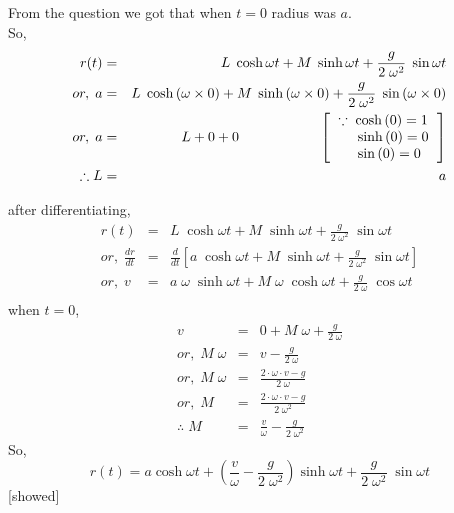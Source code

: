 \documentclass{article}
\begin{document}
\subsection{}%
\large{
    From the question we got that when $t=0$ radius was $a$.\\
    So,
    \begin{eqnarray*}
        r(t) &=& L\;\cosh{\omega t} + M\;\sinh{\omega t} + \frac{g}{2\;\omega^2}\;\sin{\omega t}\\
        or,\; a &=& L\;\cosh{(\omega\times 0)} + M\;\sinh{(\omega\times 0)} + \frac{g}{2\;\omega^2}\;\sin{(\omega \times 0)}\\
        or,\; a &=& L + 0 + 0\hspace{2cm}
        \left[
            \begin{tabular}{ll}
                $\because\; \cosh{(0)} = 1$\\
                $\;\;\;\;\; \sinh{(0)} = 0$\\
                $\;\;\;\;\; \sin{(0)} = 0$\\
            \end{tabular}
        \right]\\
        \therefore L &=& a
    \end{eqnarray*}

    after differentiating,
    \begin{eqnarray*}
        r(t) &=& L\;\cosh{\omega t} + M\;\sinh{\omega t} + \frac{g}{2\;\omega^2}\;\sin{\omega t}\\
        or,\;\frac{dr}{dt} &=& \frac{d}{dt}\left[a\;\cosh{\omega t} + M\;\sinh{\omega t} + \frac{g}{2\;\omega^2}\;\sin{\omega t}\right]\\
        or,\; v &=& a\;\omega\;\sinh{\omega t} + M\;\omega\;\cosh{\omega t} + \frac{g}{2\;\omega}\;\cos{\omega t}\\
    \end{eqnarray*}
    when $t=0$,
    \begin{eqnarray*}
        v &=& 0 + M\;\omega + \frac{g}{2\;\omega}\\
        or,\; M\;\omega &=& v-\frac{g}{2\;\omega}\\
        or,\; M\;\omega &=& \frac{2\cdot \omega \cdot v - g}{2\;\omega}\\
        or,\; M &=& \frac{2\cdot \omega \cdot v - g}{2\;\omega^2}\\
        \therefore\; M &=& \frac{v}{\omega} - \frac{g}{2\;\omega^2}
    \end{eqnarray*}
    So,
    $$r(t) = a\cosh{\omega t}+\left(\frac{v}{\omega} - \frac{g}{2\;\omega^2}\right)\sinh{\omega t} + \frac{g}{2\;\omega^2}\;\sin{\omega t}$$
    \hspace{12cm}[showed]

}
\end{document}
